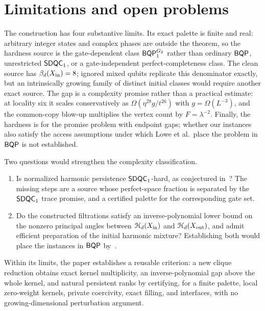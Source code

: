 \section{Limitations and open problems}
\label{sec:limitations}

The construction has four substantive limits.  Its exact palette is finite
and real: arbitrary integer states and complex phases are outside the
theorem, so the hardness source is the gate-dependent class
\(\mathsf{BQP}_{1}^{G_2}\) rather than ordinary \(\mathsf{BQP}\), unrestricted \(\mathsf{SDQC}_{1}\),
or a gate-independent perfect-completeness class.  The clean source has
\(\beta_d(X_{\mathrm{in}})=8\); ignored mixed qubits replicate this denominator
exactly, but an intrinsically growing family of distinct initial classes
would require another exact source.  The gap is a complexity promise rather
than a practical estimate: at locality six it scales conservatively as
\(\Omega(\eta^{28}g/t^{26})\) with \(g=\Omega(L^{-3})\), and the common-copy
blow-up multiplies the vertex count by \(F=\lambda^{-2}\).  Finally, the
hardness is for the promise problem with endpoint gaps; whether our instances
also satisfy the access assumptions under which Lowe et al.\ place the
problem in \(\mathsf{BQP}\) is not established.

Two questions would strengthen the complexity classification.
\begin{enumerate}
\item Is normalized harmonic persistence \(\mathsf{SDQC}_{1}\)-hard, as conjectured
in~\cite{lowe2026normalized}?  The missing steps are a source whose
perfect-space fraction is separated by the \(\mathsf{SDQC}_{1}\) trace promise, and a
certified palette for the corresponding gate set.
\item Do the constructed filtrations satisfy an inverse-polynomial lower
bound on the nonzero principal angles between \(\mathcal{H}_d(X_{\mathrm{in}})\) and
\(\mathcal{H}_d(X_{\mathrm{out}})\), and admit efficient preparation of the initial harmonic
mixture?  Establishing both would place the instances in \(\mathsf{BQP}\)
by~\cite[Lemma~7]{lowe2026normalized}.
\end{enumerate}

Within its limits, the paper establishes a reusable criterion: a new clique
reduction obtains exact kernel multiplicity, an inverse-polynomial gap above
the whole kernel, and natural persistent ranks by certifying, for a finite
palette, local zero-weight kernels, private coercivity, exact filling, and
interfaces, with no growing-dimensional perturbation argument.
